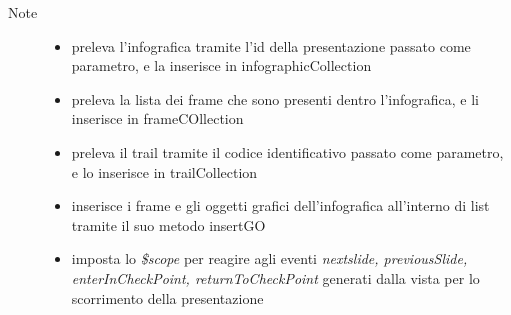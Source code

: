 \begin{description}
\begin{description}
		\begin{description}
			\item[Note] \hfill
			\begin{itemize}
					\item preleva l'infografica tramite l'id della presentazione passato come parametro, e la inserisce in infographicCollection
					\item preleva la lista dei frame che sono presenti dentro l'infografica, e li inserisce in frameCOllection
					\item preleva il trail tramite il codice identificativo passato come parametro, e lo inserisce in trailCollection
					\item inserisce i frame e gli oggetti grafici dell'infografica all'interno di list tramite il suo metodo insertGO
					\item imposta lo \textit{\$scope} per reagire agli eventi \textit{nextslide, previousSlide, enterInCheckPoint, returnToCheckPoint} generati dalla vista per lo scorrimento della presentazione
			\end{itemize}
		\end{description}
	\end{description}

\end{description}










